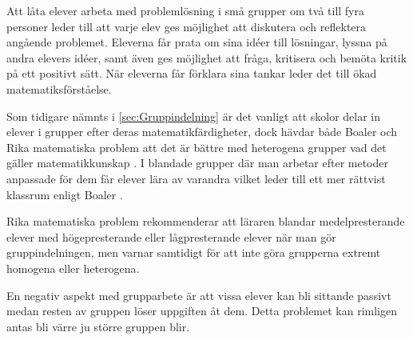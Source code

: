 \textcolor{turkos} {
Att låta elever arbeta med problemlösning i små grupper om två till fyra personer leder till att varje elev ges möjlighet att diskutera och reflektera angående problemet. Eleverna får prata om sina idéer till lösningar, lyssna på andra elevers idéer, samt även ges möjlighet att fråga, kritisera och bemöta kritik på ett positivt sätt. När eleverna får förklara sina tankar leder det till ökad matematiksförståelse. \cite{RikaProblem}
}

\textcolor{turkos} {
Som tidigare nämnts i \ref{sec:Gruppindelning} är det vanligt att skolor delar in elever i grupper efter deras matematikfärdigheter, dock hävdar både Boaler och Rika matematiska problem att det är bättre med heterogena grupper vad det gäller matematikkunskap \cite{TheElephant}\cite{RikaProblem}. I blandade grupper där man arbetar efter metoder anpassade för dem får elever lära av varandra vilket leder till ett mer rättvist klassrum enligt Boaler \cite{TheElephant}. 
}

\textcolor{turkos} {
Rika matematiska problem rekommenderar att läraren blandar medelpresterande elever med högepresterande eller lågpresterande elever när man gör gruppindelningen, men varnar samtidigt för att inte göra grupperna extremt homogena eller heterogena\cite{RikaProblem}.
}




\textcolor{turkos} {
En negativ aspekt med grupparbete är att vissa elever kan bli sittande passivt medan resten av gruppen löser uppgiften åt dem\cite{RikaProblem}. Detta problemet kan rimligen antas bli värre ju större gruppen blir. 
}











